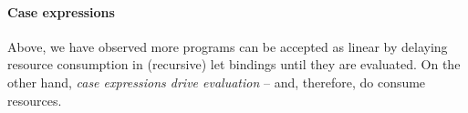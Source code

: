 \documentclass[acmsmall,review,anonymous,screen]{acmart}
\newcommand{\parawith}[1]{\paragraph{\emph{#1}}}
\begin{document}

\paragraph{Case expressions}
Above, we have observed more programs can be accepted as linear by delaying
resource consumption in (recursive) let bindings until they are evaluated.
On the other hand, \emph{case expressions drive evaluation} -- and, therefore,
do consume resources.



\end{document}
